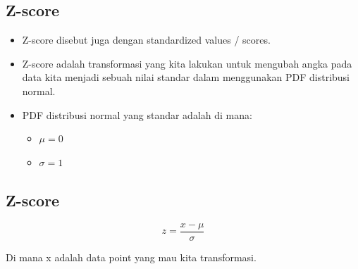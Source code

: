 \documentclass[
  letterpaper,
  DIV=11,
  numbers=noendperiod]{scrartcl}
\begin{document}
\subsection{Z-score}\label{z-score}

\begin{itemize}
\item
  Z-score disebut juga dengan standardized values / scores.
\item
  Z-score adalah transformasi yang kita lakukan untuk mengubah angka
  pada data kita menjadi sebuah nilai standar dalam menggunakan PDF
  distribusi normal.
\item
  PDF distribusi normal yang standar adalah di mana:

  \begin{itemize}
  \item
    \(\mu=0\)
  \item
    \(\sigma=1\)
  \end{itemize}
\end{itemize}

\subsection{Z-score}\label{z-score-1}

\[
z=\frac{x-\mu}{\sigma}
\]

Di mana x adalah data point yang mau kita transformasi.
\end{document}
